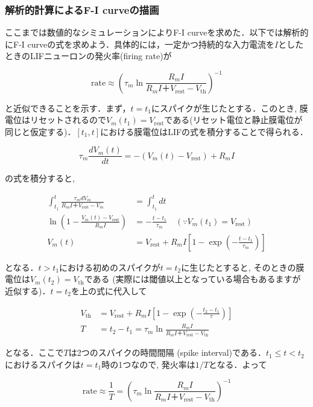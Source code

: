 \subsubsection{解析的計算によるF-I curveの描画}
ここまでは数値的なシミュレーションによりF-I curveを求めた．以下では解析的にF-I curveの式を求めよう．具体的には，一定かつ持続的な入力電流を$I$としたときのLIFニューロンの発火率(firing rate)が


\begin{equation}
\text{rate}\approx \left(\tau_m \ln \frac{R_mI}{R_mI＋V_\text{rest}-V_{\text{th}}}\right)^{-1}
\end{equation}


と近似できることを示す．まず，$t=t_1$にスパイクが生じたとする．このとき, 膜電位はリセットされるので$V_m(t_1)=V_\text{rest}$である(リセット電位と静止膜電位が同じと仮定する)．$[t_1, t]$における膜電位はLIFの式を積分することで得られる．


\begin{equation}
\tau_m \frac{dV_{m}(t)}{dt}=-(V_{m}(t)-V_\text{rest})+R_m I
\end{equation}


の式を積分すると, 


\begin{align}
\int_{t_1}^{t} \frac{\tau_m dV_m}{R_mI＋V_\text{rest}-V_m}&=\int_{t_1}^{t} dt\\
\ln \left(1-\frac{V_m(t)-V_\text{rest}}{R_mI}\right)&=-\frac{t-t_1}{\tau_m} \quad (\because V_m(t_1)=V_\text{rest})\\
V_m(t) &=V_\text{rest} + R_mI\left[1-\exp\left(-\frac{t-t_1}{\tau_m}\right)\right] 
\end{align}


となる．$t>t_1$における初めのスパイクが$t=t_2$に生じたとすると, そのときの膜電位は$V_m(t_2)=V_{\text{th}}$である (実際には閾値以上となっている場合もあるますが近似する)．$t=t_2$を上の式に代入して


\begin{align}
V_{\text{th}}&=V_\text{rest} + R_mI\left[1-\exp\left(-\frac{t_2-t_1}{\tau}\right)\right] \\
T&= t_2-t_1 = \tau_m \ln \frac{R_mI}{R_mI＋V_\text{rest}-V_{\text{th}}}
\end{align}


となる．ここで$T$は2つのスパイクの時間間隔 (spike interval)である．$t_1\leq t<t_2$におけるスパイクは$t=t_1$時の1つなので, 発火率は$1/T$となる．よって


\begin{equation}
\text{rate}\approx \frac{1}{T}=\left(\tau_m \ln \frac{R_mI}{R_mI＋V_\text{rest}-V_{\text{th}}}\right)^{-1}
\end{equation}


